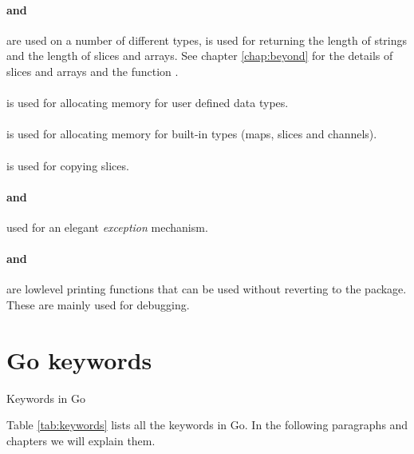 \paragraph{ and } are used on a number of different
types,  is
used for returning the length of strings and the length of slices and
arrays. See chapter \ref{chap:beyond} for the details of slices and
arrays and the function .

\paragraph{} is used for allocating memory for user defined
data types.

\paragraph{} is used for allocating memory for built-in
types (maps, slices and channels).

\paragraph{} is used for copying slices. 

\paragraph{ and } used for an elegant \emph{exception} mechanism.

\paragraph{ and } are lowlevel printing
functions that can be used without reverting to the 
package. These are mainly used for debugging.

\section{Go keywords}
\begin{table}[H]
\begin{center}
\caption{Keywords in Go}
\label{tab:keywords}

\end{center}
\end{table}
Table \ref{tab:keywords} lists all the keywords in Go. 
In the following paragraphs and chapters we will explain them.

